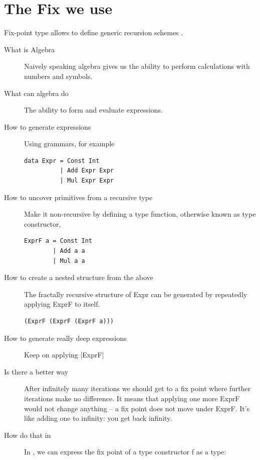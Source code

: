 \documentclass[thesis-solanki.tex]{subfiles}
\begin{document}
\section{The Fix we use}
Fix-point type allows to define generic recursion schemes \cite{data-fix-lib}.
\cite{website:understandingalgebrasfpcomplete}
\begin{description}
\item[What is Algebra]
Naively speaking algebra gives us the ability to perform calculations with numbers and symbols.

\item[What can algebra do]
The ability to form and evaluate expressions.

\item[How to generate expressions]
Using grammars, for example
\begin{verbatim}
data Expr = Const Int
          | Add Expr Expr
          | Mul Expr Expr
\end{verbatim}

\item[How to uncover primitives from a recursive type]
Make it non-recursive by defining a type function, otherwise known as type constructor,
\begin{verbatim}
ExprF a = Const Int
        | Add a a
        | Mul a a
\end{verbatim}

\item[How to create a nested structure from the above]
The fractally recursive structure of Expr can be generated by repeatedly applying ExprF to itself.
\begin{verbatim}
(ExprF (ExprF (ExprF a)))
\end{verbatim}

\item[How to generate really deep expressions]
Keep on applying |ExprF|

\item[Is there a better way]
After infinitely many iterations we should get to a fix point where further iterations make no difference. It means that applying one more 
ExprF would not change anything -- a fix point does not move under ExprF. It's like adding one to infinity: you get back infinity.   

\item[How do that in ]
In , we can express the fix point of a type constructor f as a type:


\end{description}
\end{document}
